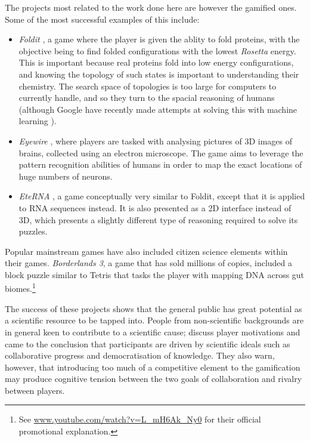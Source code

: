 The projects most related to the work done here are however the gamified ones. Some of the most successful examples of this include:
\begin{itemize}[leftmargin=*]
  \item \emph{Foldit} \citep{Cooper2010}, a game where the player is given the ablity to fold proteins, with the objective being to find folded configurations with the lowest \emph{Rosetta} energy. This is important because real proteins fold into low energy configurations, and knowing the topology of such states is important to understanding their chemistry. The search space of topologies is too large for computers to currently handle, and so they turn to the spacial reasoning of humans (although Google have recently made attempts at solving this with machine learning \citep{Senior2020}).
  \item \emph{Eyewire} \citep{Bae2018}, where players are tasked with analysing pictures of 3D images of brains, collected using an electron microscope. The game aims to leverage the pattern recognition abilities of humans in order to map the exact locations of huge numbers of neurons.
  \item \emph{EteRNA} \citep{Lee2014}, a game conceptually very similar to Foldit, except that it is applied to RNA sequences instead. It is also presented as a 2D interface instead of 3D, which presents a slightly different type of reasoning required to solve its puzzles.
\end{itemize}

Popular mainstream games have also included citizen science elements within their games. \emph{Borderlands 3}, a game that has sold millions of copies, included a block puzzle similar to Tetris that tasks the player with mapping DNA across gut biomes.\footnote{See \url{www.youtube.com/watch?v=L_mH6Ak_Ny0} for their official promotional explanation.}

The success of these projects shows that the general public has great potential as a scientific resource to be tapped into.
People from non-scientific backgrounds are in general keen to contribute to a scientific cause; \citet{Ponti2018} discuss player motivations and came to the conclusion that participants are driven by scientific ideals such as collaborative progress and democratisation of knowledge. They also warn, however, that introducing too much of a competitive element to the gamification may produce cognitive tension between the two goals of collaboration and rivalry between players.

